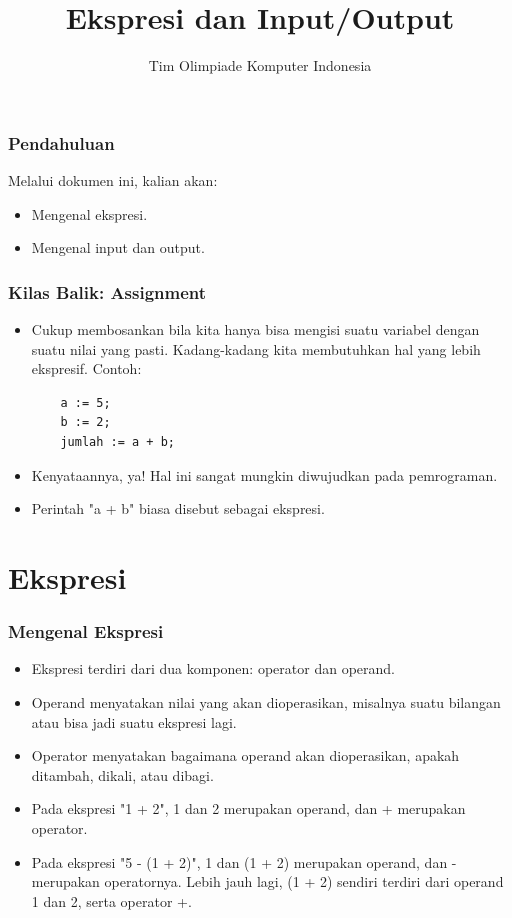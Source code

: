 \documentclass{beamer}
\title{Ekspresi dan Input/Output}
\author{Tim Olimpiade Komputer Indonesia}
\begin{document}
\begin{frame}
\titlepage
\end{frame}

\begin{frame}
\frametitle{Pendahuluan}
Melalui dokumen ini, kalian akan:
\begin{itemize}
	\item Mengenal ekspresi.
	\item Mengenal input dan output.
\end{itemize}
\end{frame}

\begin{frame}[fragile]
\frametitle{Kilas Balik: Assignment}
\begin{itemize}
	\item Cukup membosankan bila kita hanya bisa mengisi suatu variabel dengan suatu nilai yang pasti. Kadang-kadang kita membutuhkan hal yang lebih ekspresif. Contoh:
	\begin{lstlisting}
	a := 5;
	b := 2;
	jumlah := a + b;
	\end{lstlisting}
	\item Kenyataannya, ya! Hal ini sangat mungkin diwujudkan pada pemrograman.
	\item Perintah "a + b" biasa disebut sebagai \alert{ekspresi}.
\end{itemize}
\end{frame}

\section{Ekspresi}
\frame{\sectionpage}

\begin{frame}
\frametitle{Mengenal Ekspresi}
\begin{itemize}
	\item Ekspresi terdiri dari dua komponen: \alert{operator} dan \alert{operand}.
	\item Operand menyatakan nilai yang akan dioperasikan, misalnya suatu bilangan atau bisa jadi suatu ekspresi lagi.
	\item Operator menyatakan bagaimana operand akan dioperasikan, apakah ditambah, dikali, atau dibagi.
	\item Pada ekspresi "1 + 2", 1 dan 2 merupakan operand, dan + merupakan operator.
	\item Pada ekspresi "5 - (1 + 2)", 1 dan (1 + 2) merupakan operand, dan - merupakan operatornya. Lebih jauh lagi, (1 + 2) sendiri terdiri dari operand 1 dan 2, serta operator +.
\end{itemize}
\end{frame}
\end{document}
